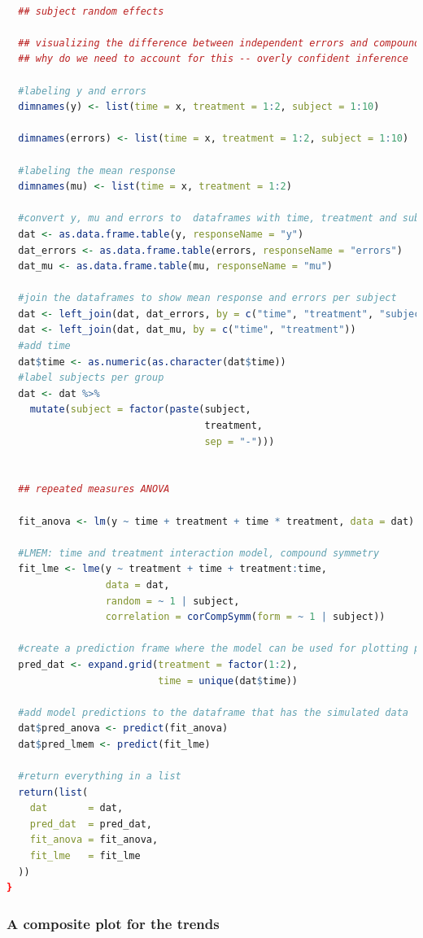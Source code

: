 \documentclass[
]{article}
\begin{document}
\begin{lstlisting}[language=R]
  
  ## subject random effects
  
  ## visualizing the difference between independent errors and compound symmetry
  ## why do we need to account for this -- overly confident inference
  
  #labeling y and errors  
  dimnames(y) <- list(time = x, treatment = 1:2, subject = 1:10)
  
  dimnames(errors) <- list(time = x, treatment = 1:2, subject = 1:10)
  
  #labeling the mean response
  dimnames(mu) <- list(time = x, treatment = 1:2)
  
  #convert y, mu and errors to  dataframes with time, treatment and subject columns
  dat <- as.data.frame.table(y, responseName = "y")
  dat_errors <- as.data.frame.table(errors, responseName = "errors")
  dat_mu <- as.data.frame.table(mu, responseName = "mu")
  
  #join the dataframes to show mean response and errors per subject
  dat <- left_join(dat, dat_errors, by = c("time", "treatment", "subject"))
  dat <- left_join(dat, dat_mu, by = c("time", "treatment"))
  #add time
  dat$time <- as.numeric(as.character(dat$time))
  #label subjects per group
  dat <- dat %>%
    mutate(subject = factor(paste(subject, 
                                  treatment, 
                                  sep = "-")))
  
  
  ## repeated measures ANOVA 
  
  fit_anova <- lm(y ~ time + treatment + time * treatment, data = dat)
  
  #LMEM: time and treatment interaction model, compound symmetry 
  fit_lme <- lme(y ~ treatment + time + treatment:time,
                 data = dat,
                 random = ~ 1 | subject,
                 correlation = corCompSymm(form = ~ 1 | subject))
  
  #create a prediction frame where the model can be used for plotting purposes
  pred_dat <- expand.grid(treatment = factor(1:2), 
                          time = unique(dat$time))
  
  #add model predictions to the dataframe that has the simulated data
  dat$pred_anova <- predict(fit_anova)
  dat$pred_lmem <- predict(fit_lme)
  
  #return everything in a list
  return(list(
    dat       = dat,
    pred_dat  = pred_dat,
    fit_anova = fit_anova,
    fit_lme   = fit_lme
  ))
}
\end{lstlisting}

\hypertarget{a-composite-plot-for-the-trends}{%
\subsubsection{A composite plot for the trends}\label{a-composite-plot-for-the-trends}}
\end{document}
